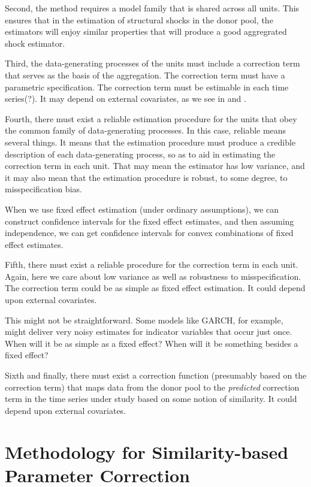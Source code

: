 \documentclass[11pt]{article}
\theoremstyle{definition}
\begin{document}
Second, the method requires a model family that is shared across all units.  This ensures that in the estimation of structural shocks in the donor pool, the estimators will enjoy similar properties that will produce a good aggregrated shock estimator.

Third, the data-generating processes of the units must include a correction term that serves as the basis of the aggregation.  The correction term must have a parametric specification.  The correction term must be estimable in each time series(?).   It may depend on external covariates, as we see in \cite{lin2021minimizing} and \cite{lundquist2024volatility}.

Fourth, there must exist a reliable estimation procedure for the units that obey the common family of data-generating processes.  In this case, reliable means several things.  It means that the estimation procedure must produce a credible description of each data-generating process, so as to aid in estimating the correction term in each unit.  That may mean the estimator has low variance, and it may also mean that the estimation procedure is robust, to some degree, to misspecification bias.

When we use fixed effect estimation (under ordinary assumptions), we can construct confidence intervals for the fixed effect estimates, and then assuming independence, we can get confidence intervals for convex combinations of fixed effect estimates.

Fifth, there must exist a reliable procedure for the correction term in each unit.  Again, here we care about low variance as well as robustness to misspecification.  The correction term could be as simple as fixed effect estimation.  It could depend upon external covariates.

This might not be straightforward.  Some models like GARCH, for example, might deliver very noisy estimates for indicator variables that occur just once.  When will it be as simple as a fixed effect?  When will it be something besides a fixed effect?

Sixth and finally, there must exist a correction function (presumably based on the correction term) that maps data from the donor pool to the \textit{predicted} correction term in the time series under study based on some notion of similarity.  It could depend upon external covariates.

\section{Methodology for Similarity-based Parameter Correction}
\end{document}
